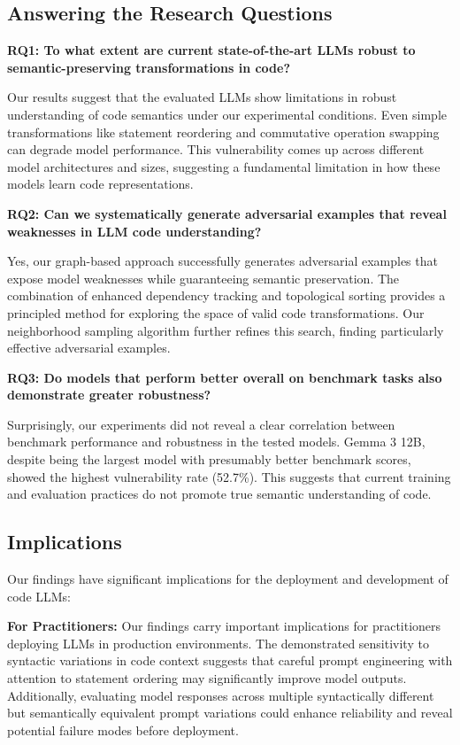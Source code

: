 \documentclass[%
thesis=student,%
coverpage=false,%
titlepage=false,%
headmarks=true, %
english,%
font=libertine, %
math=newpxtx, %
BCOR=5mm,%
coverBCOR=11mm%
]{tum-templates/book/tumbook}
\begin{document}
\subsection{Answering the Research Questions}

\textbf{RQ1: To what extent are current state-of-the-art LLMs robust to semantic-preserving transformations in code?}

Our results suggest that the evaluated LLMs show limitations in robust understanding of code semantics under our experimental conditions. Even simple transformations like statement reordering and commutative operation swapping can degrade model performance. This vulnerability comes up across different model architectures and sizes, suggesting a fundamental limitation in how these models learn code representations.

\textbf{RQ2: Can we systematically generate adversarial examples that reveal weaknesses in LLM code understanding?}

Yes, our graph-based approach successfully generates adversarial examples that expose model weaknesses while guaranteeing semantic preservation. The combination of enhanced dependency tracking and topological sorting provides a principled method for exploring the space of valid code transformations. Our neighborhood sampling algorithm further refines this search, finding particularly effective adversarial examples.

\textbf{RQ3: Do models that perform better overall on benchmark tasks also demonstrate greater robustness?}

Surprisingly, our experiments did not reveal a clear correlation between benchmark performance and robustness in the tested models. Gemma 3 12B, despite being the largest model with presumably better benchmark scores, showed the highest vulnerability rate (52.7\%). This suggests that current training and evaluation practices do not promote true semantic understanding of code.

\subsection{Implications}

Our findings have significant implications for the deployment and development of code LLMs:

\textbf{For Practitioners:}
Our findings carry important implications for practitioners deploying LLMs in production environments. The demonstrated sensitivity to syntactic variations in code context suggests that careful prompt engineering with attention to statement ordering may significantly improve model outputs. Additionally, evaluating model responses across multiple syntactically different but semantically equivalent prompt variations could enhance reliability and reveal potential failure modes before deployment.
\end{document}

